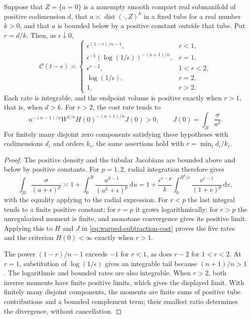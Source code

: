 \begin{proposition}\label{prop:warped-subtraction-profiles}
Suppose that $Z=\{a=0\}$ is a nonempty smooth compact real submanifold of positive codimension $d$, that $a\asymp\operatorname{dist}(\cdot,Z)^k$ in a fixed tube for a real number $k>0$, and that $a$ is bounded below by a positive constant outside that tube. Put $r=d/k$. Then, as $\epsilon\downarrow0$,
\begin{equation}\label{eq:warped-subtraction-profiles}
 \mathcal C(t-\epsilon)\asymp
 \begin{cases}
  \epsilon^{(1-r)/n-1},&r<1,\\
  \epsilon^{-1}(\log(1/\epsilon))^{-(n+1)/n},&r=1,\\
  \epsilon^{r-2},&1<r<2,\\
  \log(1/\epsilon),&r=2,\\
  1,&r>2.
 \end{cases}
\end{equation}
Each rate is integrable, and the endpoint volume is positive exactly when $r>1$, that is, when $d>k$. For $r>2$, the cost rate tends to
\[
 n^{-(n-1)/n}W^{1/n}H(0)^{-(n+1)/n}J(0)>0,
 \qquad J(0)=\int_B\frac{\sigma}{a^2}.
\]
For finitely many disjoint zero components satisfying these hypotheses with codimensions $d_i$ and orders $k_i$, the same assertions hold with $r=\min_i d_i/k_i$.
\end{proposition}
\begin{proof}
The positive density and the tubular Jacobians are bounded above and below by positive constants. For $p=1,2$, radial integration therefore gives
\[
 \int_B\frac{\sigma}{(a+\epsilon)^p}
 \asymp 1+\int_0^R\frac{u^{d-1}}{(u^k+\epsilon)^p}\,\mathrm{d}u
 =1+\frac{\epsilon^{r-p}}k
       \int_0^{R^k/\epsilon}\frac{v^{r-1}}{(1+v)^p}\,\mathrm{d}v,
\]
with the equality applying to the radial expression. For $r<p$ the last integral tends to a finite positive constant; for $r=p$ it grows logarithmically; for $r>p$ the unregularized moment is finite, and monotone convergence gives its positive limit. Applying this to $H$ and $J$ in \eqref{eq:warped-subtraction-cost} proves the five rates and the criterion $H(0)<\infty$ exactly when $r>1$.

The power $(1-r)/n-1$ exceeds $-1$ for $r<1$, as does $r-2$ for $1<r<2$. At $r=1$, substitution of $\log(1/\epsilon)$ gives an integrable tail because $(n+1)/n>1$. The logarithmic and bounded rates are also integrable. When $r>2$, both inverse moments have finite positive limits, which gives the displayed limit. With finitely many disjoint components, the moments are finite sums of positive tube contributions and a bounded complement term; their smallest ratio determines the divergence, without cancellation.
\end{proof}

